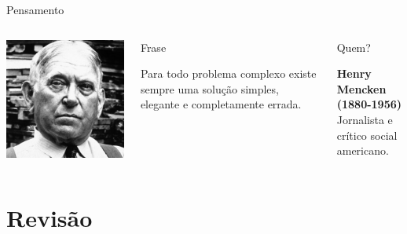 \documentclass[xcolor=dvipsnames,table]{beamer}
\begin{document}
	\begin{frame}{Pensamento}
		\begin{columns}
		  		\begin{center}
		    		\includegraphics[height=.5\textheight]{images/mencken.jpg}
		  		\end{center}
				\begin{block}{Frase}
					\begin{center}
						{\large Para todo problema complexo existe sempre uma solução simples, elegante e completamente errada.}
					\end{center}
				\end{block}		  		
		  		\begin{block}{Quem?}
		  			\begin{center}
						{\bf Henry Mencken (1880-1956)} \\ Jornalista e crítico social americano.
					\end{center}
				\end{block}
		\end{columns}
	\end{frame}
	

\section{Revisão}
	
\end{document}
